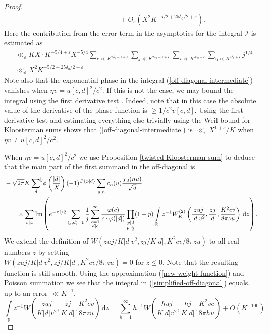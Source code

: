\documentclass[a4paper,10pt,twoside]{amsart}
\theoremstyle{definition}
\numberwithin{equation}{section}
\newcommand\eps{\varepsilon}
\renewcommand{\Im}{\textnormal{Im}}
\renewcommand\:{\colon}
\newcommand{\sumflat}{\mathop{{\sum}^{\raisebox{-3pt}{\makebox[0pt][l]{$\flat$}}}}}
\begin{document}
\begin{proof}
\begin{align}
&\qquad\qquad\qquad\qquad+O_\eps\left(X^{2}K^{-5/2+25\delta_0/2+\eps}\right) \nonumber.
\end{align} 
Here the contribution from the error term in the asymptotics for the integral $\mathcal I$ is estimated as
\begin{align*}
& \ll_\eps KX\cdot K^{-5/4+\eps} X^{-5/4}\sum_{c\ll K^{2\delta_0-1+\eps}}\sum_{j\ll K^{2\delta_0-1+\eps}}\sum_{v\ll K^{4\delta_0+\eps}}\sum_{\eta\ll K^{4\delta_0+\eps}}j^{1/4}\\
& \ll_\eps X^{2}K^{-5/2+25\delta_0/2+\eps}
\end{align*}
Note also that the exponential phase in the integral (\ref{off-diagonal-intermediate}) vanishes when $\eta v=u[c,d]^2/c^2$. If this is not the case, we may bound the integral using the first derivative test \cite[Section 1.5.]{Huxley1996}. Indeed, note that in this case the absolute value of the derivative of the phase function is $\geq 1/c^2v[c,d]$. Using the first derivative test and estimating everything else trivially using the Weil bound for Kloosterman sums shows that (\ref{off-diagonal-intermediate}) is $\ll_\eps X^{1+\eps}/K$ when $\eta v\neq u[c,d]^2/c^2$. 

When $\eta v=u[c,d]^2/c^2$ we use Proposition \ref{twisted-Kloosterman-sum} to deduce that the main part of the first summand in the off-diagonal is
\begin{align}\label{simplified-off-diagonal}
&-\sqrt{2\pi} K\sumflat_d\,\phi\left(\frac{|d|}X\right)(-1)^{\#\{p|d\}}\sum_{u|n}c_n(u)\frac{\chi_d(nu)}{\sqrt u} \nonumber \\
&\qquad\times\sum_{v|u}\Im\left(e^{-\pi i/2}\sum_{(j,d)=1}\frac 1j\sum_{\substack{c=1\\
d|c}}^\infty \frac{\varphi(c)}{c\cdot\varphi(|d|)}\prod_{\substack{p|d\\
p|\frac cd}}(1-p)\int\limits_{\mathbb R} z^{-1}W_K^{(2)}\left(\frac{zuj}{|d|v^2},\frac{zj}{|d|},\frac{K^2cv}{8\pi zu}\right)\,\mathrm d z\right).
\end{align}
We extend the definition of $W(zuj/K|d|v^2,zj/K|d|,K^2cv/8\pi zu)$ to all real numbers $z$ by setting\\ $W(zuj/K|d|v^2,zj/K|d|,K^2cv/8\pi zu)=0$ for $z\leq 0$. Note that the resulting function is still smooth. Using the approximation (\ref{new-weight-function}) and Poisson summation we see that the integral in (\ref{simplified-off-diagonal}) equals, up to an error $\ll K^{-1}$, 
\[\int\limits_{\mathbb R} z^{-1}W\left(\frac{zuj}{K|d|v^2},\frac {zj}{K|d|},\frac{K^2cv}{8\pi zu}\right)\,\mathrm d z=\sum_{h=1}^\infty h^{-1}W\left(\frac{huj}{K|d|v^2},\frac {hj}{K|d|},\frac{K^2vc}{8\pi hu}\right)+O\left(K^{-100}\right).
\]


\end{proof}
\end{document}
